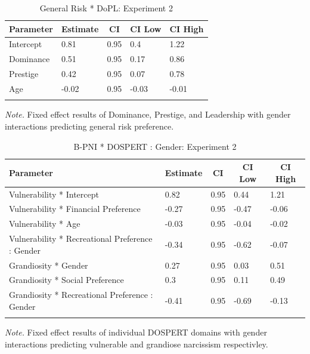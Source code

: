 \documentclass[
  donotrepeattitle,doc, 12pt, a4paper,floatsintext]{apa7}
\begin{document}
\begin{table}[h]
\begin{center}
\begin{threeparttable}
\caption{\label{tab:PNI Model DoPL Exp 2}General Risk * DoPL: Experiment 2}
\begin{tabular}{lllll}
\toprule
Parameter & \multicolumn{1}{c}{Estimate} & \multicolumn{1}{c}{CI} & \multicolumn{1}{c}{CI Low} & \multicolumn{1}{c}{CI High}\\
\midrule
Intercept & 0.81 & 0.95 & 0.4 & 1.22\\
Dominance & 0.51 & 0.95 & 0.17 & 0.86\\
Prestige & 0.42 & 0.95 & 0.07 & 0.78\\
Age & -0.02 & 0.95 & -0.03 & -0.01\\
\bottomrule
\addlinespace
\end{tabular}
\begin{tablenotes}[para]
\normalsize{\textit{Note.} Fixed effect results of Dominance, Prestige, and Leadership with gender interactions predicting general risk preference.}
\end{tablenotes}
\end{threeparttable}
\end{center}
\end{table}
\begin{table}[h]
\begin{center}
\begin{threeparttable}
\caption{\label{tab:Vulnerability and Grandiosity_DOSPERT}B-PNI * DOSPERT : Gender: Experiment 2}
\begin{tabular}{lllll}
\toprule
Parameter & \multicolumn{1}{c}{Estimate} & \multicolumn{1}{c}{CI} & \multicolumn{1}{c}{CI Low} & \multicolumn{1}{c}{CI High}\\
\midrule
Vulnerability * Intercept & 0.82 & 0.95 & 0.44 & 1.21\\
Vulnerability * Financial Preference & -0.27 & 0.95 & -0.47 & -0.06\\
Vulnerability * Age & -0.03 & 0.95 & -0.04 & -0.02\\
Vulnerability * Recreational Preference : Gender & -0.34 & 0.95 & -0.62 & -0.07\\
Grandiosity * Gender & 0.27 & 0.95 & 0.03 & 0.51\\
Grandiosity * Social Preference & 0.3 & 0.95 & 0.11 & 0.49\\
Grandiosity * Recreational Preference : Gender & -0.41 & 0.95 & -0.69 & -0.13\\
\bottomrule
\addlinespace
\end{tabular}
\begin{tablenotes}[para]
\normalsize{\textit{Note.} Fixed effect results of individual DOSPERT domains with gender interactions predicting vulnerable and grandiose narcissism respectivley.}
\end{tablenotes}
\end{threeparttable}
\end{center}
\end{table}
\end{document}
